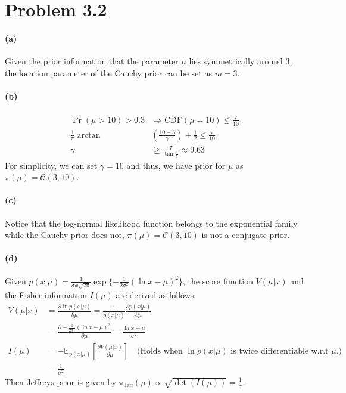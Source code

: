 \section{Problem 3.2}
\paragraph{(a)}
Given the prior information that the parameter $\mu$ lies symmetrically around 3, the location parameter of the Cauchy prior can be set as $m=3$.

\paragraph{(b)}
\begin{align*}
    \Pr(\mu > 10) > 0.3 &\Longrightarrow \mathrm{CDF}(\mu=10) \leq \frac{7}{10}\\
    \frac{1}{\pi} \arctan &\left( \frac{10 - 3}{\gamma} \right) + \frac{1}{2} \leq \frac{7}{10} \\
    \gamma &\geq \frac{7}{\tan{\frac{\pi}{5}}} \approx 9.63
\end{align*}
For simplicity, we can set $\gamma = 10$ and thus, we have prior for $\mu$ as $\pi(\mu) = \mathcal{C}(3, 10)$.

\paragraph{(c)}
Notice that the log-normal likelihood function belongs to the exponential family while the Cauchy prior does not, $\pi(\mu) = \mathcal{C}(3, 10)$ is not a conjugate prior.

\paragraph{(d)}
Given $p(x \vert \mu) = \frac{1}{\sigma x \sqrt{2\pi}} \exp\{-\frac{1}{2\sigma^2} (\ln{x} - \mu)^2 \}$, the score function $V(\mu \vert x)$ and the Fisher information $I(\mu)$ are derived as follows:
\begin{align*}
    V(\mu \vert x) 
    &= \frac{\partial \ln p(x \vert \mu)}{\partial \mu} = \frac{1}{p(x \vert \mu)} \frac{\partial p(x \vert \mu)}{\partial \mu}\\
    &= \frac{\partial -\frac{1}{2\sigma^2} (\ln x - \mu)^2}{\partial \mu} = \frac{\ln x - \mu}{\sigma^2}\\
    I(\mu)
    &= - \mathbb{E}_{p(x \vert \mu)} \left[ \frac{\partial V(\mu \vert x)}{ \partial \mu} \right] \quad \text{(Holds when $\ln p(x \vert \mu)$ is twice differentiable w.r.t $\mu$.)}\\
    &= \frac{1}{\sigma^2}
\end{align*}
Then Jeffreys prior is given by $\pi_{\mathrm{Jeff}}(\mu) \propto \sqrt{\det (I(\mu))} = \frac{1}{\sigma}$.